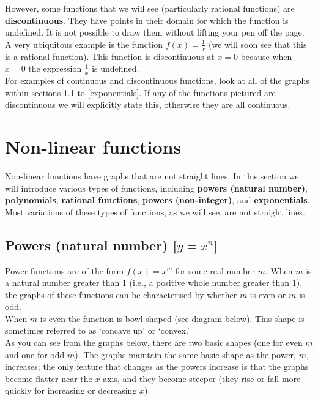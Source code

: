 \noindent However, some functions that we will see (particularly rational functions) are \textbf{discontinuous}. They have points in their domain for which the function is undefined. It is not possible to draw them without lifting your pen off the page. A very ubiquitous example is the function $f(x) = \frac{1}{x}$ (we will soon see that this is a rational function). This function is discontinuous at $x = 0$ because when $x = 0$ the expression $\frac{1}{x}$ is undefined.   \\

\noindent For examples of continuous and discontinuous functions, look at all of the graphs within sections \ref{powers (natural number)} to \ref{exponentials}. If any of the functions pictured are discontinuous we will explicitly state this, otherwise they are all continuous.


\section{Non-linear functions} \label{continuous functions} \label{discontinuous functions}
Non-linear functions have graphs that are not straight lines. In this section we will introduce various types of functions, including \textbf{powers (natural number)},  \textbf{polynomials}, \textbf{rational functions}, \textbf{powers (non-integer)}, and \textbf{exponentials}. Most variations of these types of functions, as we will see, are not straight lines. \\


\subsection{Powers (natural number) [$y = x^n$]} \label{powers (natural number)}
Power functions are of the form $f(x) = x^m$ for some real number $m$. When $m$ is a natural number greater than 1 (i.e., a positive whole number greater than 1), the graphs of these functions can be characterised by whether $m$ is even or $m$ is odd. \\

\noindent When $m$ is even the function is bowl shaped (see diagram below). This shape is sometimes referred to as `concave up' or `convex.' \\

\noindent As you can see from the graphs below, there are two basic shapes (one for even $m$ and one for odd $m$). The graphs maintain the same basic shape as the power, $m$, increases; the only feature that changes as the powers increase is that the graphs become flatter near the $x$-axis, and they become steeper (they rise or fall more quickly for increasing or decreasing $x$).

